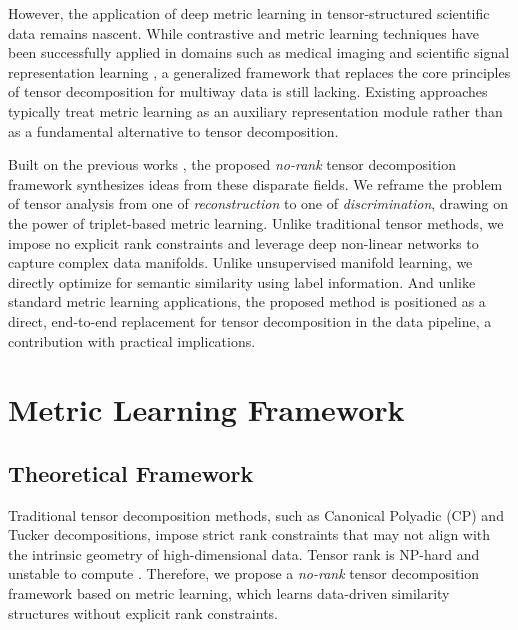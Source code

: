 \documentclass[a4paper,12pt,reqno]{amsart}
\theoremstyle{definition}
\theoremstyle{remark}
\begin{document}
However, the application of deep metric learning in tensor-structured scientific data remains nascent. While contrastive and metric learning techniques have been successfully applied in domains such as medical imaging \cite{chen2020simclr_medical} and scientific signal representation learning \cite{oord2018cpc}, a generalized framework that replaces the core principles of tensor decomposition for multiway data is still lacking. 
	Existing approaches typically treat metric learning as an auxiliary representation module rather than as a fundamental alternative to tensor decomposition.





Built on the previous works \cites{bagherian2021coupled, bagherian2022bilevel, bagherian2024tensor}, the proposed \textit{no-rank} tensor decomposition framework synthesizes ideas from these disparate fields. We reframe the problem of tensor analysis from one of \textit{reconstruction} to one of \textit{discrimination}, drawing on the power of triplet-based metric learning. Unlike traditional tensor methods, we impose no explicit rank constraints and leverage deep non-linear networks to capture complex data manifolds. Unlike unsupervised manifold learning, we directly optimize for semantic similarity using label information. And unlike standard metric learning applications, the proposed method is positioned as a direct, end-to-end replacement for tensor decomposition in the data pipeline, a contribution with practical implications.

\section{Metric Learning Framework}\label{sec:model}
\subsection{Theoretical Framework}

Traditional tensor decomposition methods, such as Canonical Polyadic (CP) and Tucker decompositions, impose strict rank constraints that may not align with the intrinsic geometry of high-dimensional data. 	Tensor rank is NP-hard and unstable to compute \cite{hillar2013most}. Therefore, we propose a \textit{no-rank} tensor decomposition framework based on metric learning, which learns data-driven similarity structures without explicit rank constraints.\\
\end{document}
